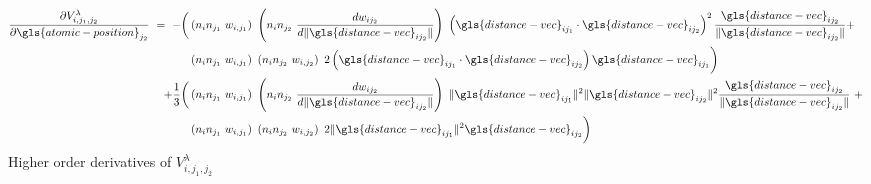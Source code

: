 \documentclass{article}
\begin{document}
\begin{equation}
\begin{split}
\frac{\partial V^{\lambda}_{i,j_1,j_2}}{\partial \gls{atomic-position}_{j_2}}\ =\ - \bigg(&\left(n_i n_{j_1}\ w_{i,j_1}\right) \left(n_i n_{j_2}\ \frac{d w_{ij_2}}{ d \| \gls{distance-vec}_{ij_2} \|} \right)\ \left(\gls{distance-vec}_{ij_1} \cdot \gls{distance-vec}_{ij_2} \right)^2 \frac{\gls{distance-vec}_{i j_2}}{\| \gls{distance-vec}_{i j_2} \|} +\ \\
&\left(n_i n_{j_1}\ w_{i,j_1}\right) \left(n_i n_{j_2}\ w_{i,j_2}\right)\ 2 \left(\gls{distance-vec}_{ij_1} \cdot \gls{distance-vec}_{ij_2} \right) \gls{distance-vec}_{ij_1} \bigg) \\
+ \frac{1}{3}\bigg(&\left(n_i n_{j_1}\ w_{i,j_1}\right) \left(n_i n_{j_2}\ \frac{d w_{ij_2}}{ d \| \gls{distance-vec}_{ij_2} \|} \right)\ \| \gls{distance-vec}_{ij_1} \|^2 \| \gls{distance-vec}_{ij_2} \|^2 \frac{\gls{distance-vec}_{i j_2}}{\| \gls{distance-vec}_{i j_2} \|} +\ \\
&\left(n_i n_{j_1}\ w_{i,j_1}\right)\ \left(n_i n_{j_2}\ w_{i,j_2}\right)\ 2 \| \gls{distance-vec}_{ij_1} \|^2 \gls{distance-vec}_{ij_2}\bigg)    
\end{split}
\end{equation}
Higher order derivatives of $V^{\lambda}_{i,j_1,j_2}$
\end{document}
